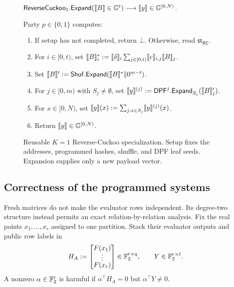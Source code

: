 \begin{figure}[H]
{\begin{minipage}{.95\textwidth}
 \par\medskip
 \noindent
 $\mathsf{ReverseCuckoo}_1.\mathsf{Expand}
 (\share B\in\mathbb G^t)
 \longrightarrow\share y\in\mathbb G^{[0,N)}$.
 \par\smallskip
 Party $p\in\{0,1\}$ computes:
 \begin{enumerate}[nosep]
  \item If setup has not completed, return $\bot$.  Otherwise, read
        $\mathsf{st}_{\mathsf{RC}}$.
  \item For $i\in[0,t)$, set
        $\share B_i^*:=\share\delta_i
        \sum_{j\in[0,t)}\share e_{i,j}\share B_j$.
  \item Set $\share B':=
        \mathsf{Shuf}.\mathsf{Expand}(\share B^*\Vert0^{m-t})$.
  \item For $j\in[0,m)$ with $S_j\neq\emptyset$, set
        $\share y^{(j)}:=
        \mathsf{DPF}^{j}.\mathsf{Expand}_{S_j}(\share B'_j)$.
  \item For $x\in[0,N)$, set
        $\share y(x):=\sum_{j:x\in S_j}\share y^{(j)}(x)$.
  \item Return $\share y\in\mathbb G^{[0,N)}$.
 \end{enumerate}
\end{minipage}}
\caption{Reusable $K=1$ Reverse-Cuckoo specialization.  Setup fixes the
addresses, programmed hashes, shuffle, and DPF leaf seeds.  Expansion supplies
only a new payload vector.}
\label{fig:reverse-cuckoo-k1}
\end{figure}

\subsection{Correctness of the programmed systems}
\label{sec:revCuckooHashCorrectness}

Fresh matrices do not make the evaluator rows independent.  Its degree-two
structure instead permits an exact relation-by-relation analysis.  Fix the
real points $x_1,\ldots,x_r$ assigned to one partition.  Stack their evaluator
outputs and public row labels in
\[
 H_A:=\begin{bmatrix}F(x_1)\\[-1mm]\vdots\\[-1mm]F(x_r)\end{bmatrix}
 \in\mathbb{F}_2^{r\times q},
 \qquad
 Y\in\mathbb{F}_2^{r\times\ell}.
\]
A nonzero $\alpha\in\mathbb{F}_2^r$ is harmful if
$\alpha^\top H_A=0$ but $\alpha^\top Y\neq0$.

